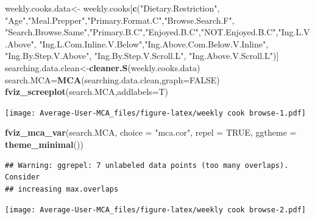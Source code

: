 \documentclass[
]{article}
\newenvironment{Shaded}{\begin{snugshade}}{\end{snugshade}}
\newcommand{\DataTypeTok}[1]{\textcolor[rgb]{0.13,0.29,0.53}{#1}}
\newcommand{\KeywordTok}[1]{\textcolor[rgb]{0.13,0.29,0.53}{\textbf{#1}}}
\newcommand{\NormalTok}[1]{#1}
\newcommand{\OtherTok}[1]{\textcolor[rgb]{0.56,0.35,0.01}{#1}}
\newcommand{\StringTok}[1]{\textcolor[rgb]{0.31,0.60,0.02}{#1}}
\begin{document}
\begin{Shaded}
\begin{Highlighting}[]
\NormalTok{weekly.cooks.data<-}\StringTok{ }\NormalTok{weekly.cooks[}\KeywordTok{c}\NormalTok{(}\StringTok{"Dietary.Restriction"}\NormalTok{, }\StringTok{"Age"}\NormalTok{,}\StringTok{"Meal.Prepper"}\NormalTok{,}\StringTok{"Primary.Format.C"}\NormalTok{,}\StringTok{"Browse.Search.F"}\NormalTok{,}
            \StringTok{"Search.Browse.Same"}\NormalTok{,}\StringTok{"Primary.B.C"}\NormalTok{,}\StringTok{"Enjoyed.B.C"}\NormalTok{,}\StringTok{"NOT.Enjoyed.B.C"}\NormalTok{,}\StringTok{"Ing.L.V.Above"}\NormalTok{,}
            \StringTok{"Ing.L.Com.Inline.V.Below"}\NormalTok{,}\StringTok{"Ing.Above.Com.Below.V.Inline"}\NormalTok{,  }\StringTok{"Ing.By.Step.V.Above"}\NormalTok{,  }\StringTok{"Ing.By.Step.V.Scroll.L"}\NormalTok{,}
            \StringTok{"Ing.Above.V.Scroll.L"}\NormalTok{)]}
\NormalTok{searching.data.clean<-}\KeywordTok{cleaner.S}\NormalTok{(weekly.cooks.data)}
\NormalTok{search.MCA=}\KeywordTok{MCA}\NormalTok{(searching.data.clean,}\DataTypeTok{graph=}\OtherTok{FALSE}\NormalTok{)}
\KeywordTok{fviz_screeplot}\NormalTok{(search.MCA,}\DataTypeTok{addlabels=}\NormalTok{T)}
\end{Highlighting}
\end{Shaded}

\texttt{[image: Average-User-MCA\_files/figure-latex/weekly cook browse-1.pdf]}

\begin{Shaded}
\begin{Highlighting}[]
\KeywordTok{fviz_mca_var}\NormalTok{(search.MCA, }\DataTypeTok{choice =} \StringTok{"mca.cor"}\NormalTok{, }\DataTypeTok{repel =} \OtherTok{TRUE}\NormalTok{,}
             \DataTypeTok{ggtheme =} \KeywordTok{theme_minimal}\NormalTok{())}
\end{Highlighting}
\end{Shaded}

\begin{verbatim}
## Warning: ggrepel: 7 unlabeled data points (too many overlaps). Consider
## increasing max.overlaps
\end{verbatim}

\texttt{[image: Average-User-MCA\_files/figure-latex/weekly cook browse-2.pdf]}

\begin{Shaded}
\end{Shaded}
\end{document}
